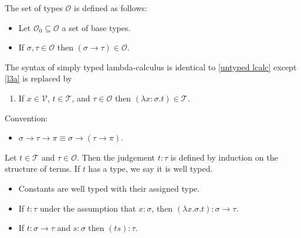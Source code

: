 \documentclass{article}
\begin{document}
\begin{definition}
	\label{simply typed lcalc}
	The set of types $\mathcal{O}$ is defined as follows:
	\begin{itemize}
		\item Let $\mathcal{O}_0\subseteq\mathcal{O}$ a set of base types.
		\item If $\sigma,\tau\in\mathcal{O}$ then $(\sigma\to\tau)\in\mathcal{O}$.
	\end{itemize}
	The syntax of simply typed lambda-calculus is identical to \ref{untyped lcalc} except \ref{l3a}
	is replaced by
	\begin{enumerate}[label=L3'.]
		\item \label{l3b} If $x\in\mathcal{V}$, $t\in\mathcal{T}$, and $\tau\in\mathcal{O}$ then
		      $(\lambda x:\sigma. t) \in\mathcal{T}$.
	\end{enumerate}
	Convention:
	\begin{itemize}
		\item $\sigma\to\tau\to\pi\equiv \sigma\to(\tau\to\pi)$.
	\end{itemize}
\end{definition}

\begin{definition*}[Judgement]
	Let $t\in\mathcal{T}$ and $\tau\in\mathcal{O}$. Then the judgement $t:\tau$ is defined by
	induction on the structure of terms. If $t$ has a type, we say it is well typed.
	\begin{itemize}
		\item Constants are well typed with their assigned type.
		\item If $t:\tau$ under the assumption that $x:\sigma$, then $(\lambda x. \sigma.t):\sigma\to\tau$.
		\item If $t:\sigma\to\tau$ and $s:\sigma$ then $(ts):\tau$.
	\end{itemize}
\end{definition*}
\end{document}
